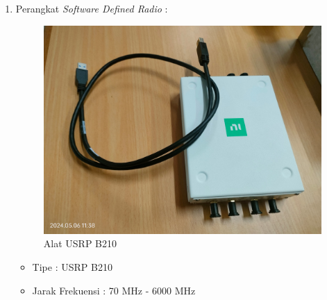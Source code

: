 \begin{enumerate}
	\item Perangkat \textit{Software Defined Radio} :
	\begin{figure}
		\begin{center}
			\includegraphics[scale=0.045]{pics/bab3/usrp2.jpg}
			\caption{Alat USRP B210}
			\label{img:logPeriodic}
		\end{center}
	\end{figure}
	\begin{itemize}
		\item Tipe : USRP B210 
		\item Jarak Frekuensi : 70 MHz - 6000 MHz 
	\end{itemize}


\end{enumerate}
